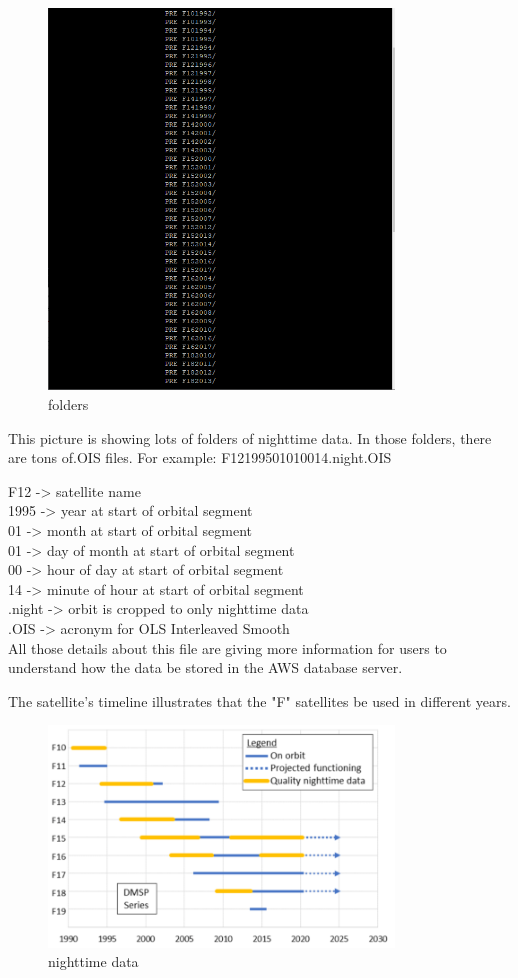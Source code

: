 \documentclass[conference]{IEEEtran}
\begin{document}
\begin{figure}[htbp]
    \centerline{\includegraphics[width=260pt]{images/2.png}}
    \caption{folders}
    \label{folders}
\end{figure}

This picture is showing lots of folders of nighttime data.  In those folders, there are tons of.OIS files. 
For example: F12199501010014.night.OIS 

F12 -> satellite name \\
1995 -> year at start of orbital segment \\
01 -> month at start of orbital segment \\
01 -> day of month at start of orbital segment \\
00 -> hour of day at start of orbital segment \\
14 -> minute of hour at start of orbital segment \\
.night -> orbit is cropped to only nighttime data \\
.OIS -> acronym for OLS Interleaved Smooth \\

All those details about this file are giving more information for users to understand how the data be stored in the AWS database server. 

The satellite's timeline illustrates that the "F" satellites be used in different years.

\begin{figure}[htbp]
\centerline{\includegraphics[width=260pt]{images/2.1.png}}
\caption{nighttime data}
\label{nighttimedata}
\end{figure}
\end{document}
